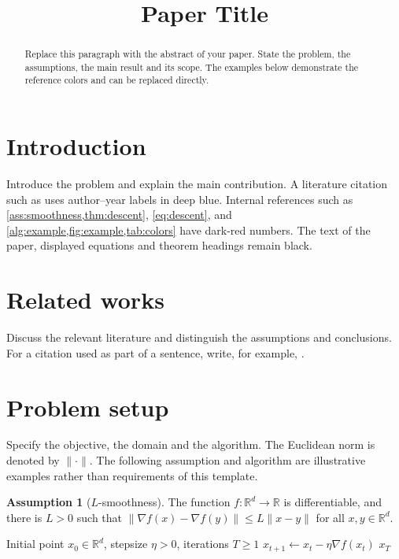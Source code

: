 \documentclass[10pt,a4paper]{article}
\title{Paper Title}
\author{}
\date{}
\theoremstyle{definition}
\newtheorem{assumption}{Assumption}[section]
\theoremstyle{remark}
\newcommand{\R}{\mathbb R}
\begin{document}
\maketitle

\begin{abstract}
Replace this paragraph with the abstract of your paper. State the
problem, the assumptions, the main result and its scope. The examples
below demonstrate the reference colors and can be replaced directly.
\end{abstract}

\section{Introduction}

Introduce the problem and explain the main contribution. A literature
citation such as \citep{robbins1951} uses author--year labels in deep blue. Internal references
such as \cref{ass:smoothness,thm:descent}, \eqref{eq:descent}, and
\cref{alg:example,fig:example,tab:colors} have dark-red numbers.
The text of the paper, displayed equations and theorem headings
remain black.

\section{Related works}

Discuss the relevant literature and distinguish the assumptions and
conclusions. For a citation used as part of a sentence, write, for
example, \citet{robbins1951}.

\section{Problem setup}

Specify the objective, the domain and the algorithm. The Euclidean
norm is denoted by $\|\cdot\|$. The following assumption and algorithm
are illustrative examples rather than requirements of this template.

\begin{assumption}[$L$-smoothness]
\label{ass:smoothness}
The function $f:\R^d\to\R$ is differentiable, and there is $L>0$ such that
$\|\nabla f(x)-\nabla f(y)\|\le L\|x-y\|$ for all $x,y\in\R^d$.
\end{assumption}

\begin{algorithm}[htbp]
\caption{Gradient descent: an illustrative algorithm}
\label{alg:example}
\begin{algorithmic}[1]
\Require Initial point $x_0\in\R^d$, stepsize $\eta>0$, iterations $T\ge1$
  \State $x_{t+1}\gets x_t-\eta\nabla f(x_t)$
\EndFor
\State \Return $x_T$
\end{algorithmic}
\end{algorithm}
\end{document}
